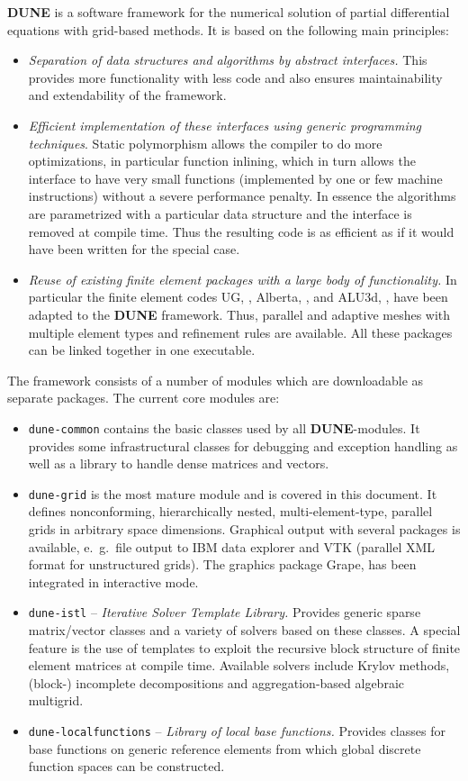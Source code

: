 \documentclass[11pt,a4paper,headinclude,footinclude,DIV16,normalheadings]{scrreprt}
\newcommand{\Dune}{{\sf\bfseries DUNE}\xspace}
\begin{document}
\Dune{} is a software framework for the numerical solution of partial
differential equations with grid-based methods. It is based on the
following main principles:
\begin{itemize}
\item \textit{Separation of data structures and
algorithms by abstract interfaces.} This provides more functionality
with less code and also ensures maintainability and
extendability of the framework.
\item \textit{Efficient implementation of these
interfaces using generic programming techniques}. Static polymorphism
allows the compiler to do more optimizations, in particular function
inlining, which in turn allows the interface to have very small
functions (implemented by one or few machine instructions) without a
severe performance penalty. In essence the algorithms are parametrized
with a particular data structure and the interface is removed at
compile time. Thus the resulting code is as efficient as if it would
have been written for the special case.
\item \textit{Reuse of existing finite element packages with a large body of
functionality.} In particular the finite element codes UG, \cite{ug},
Alberta, \cite{Alberta}, and ALU3d, \cite{ALU3d}, have been
adapted to the \Dune{} framework. Thus, parallel and adaptive meshes with
multiple element types and refinement rules are available. All these
packages can be linked together in one executable.
\end{itemize}

The framework consists of a number of modules which are downloadable
as separate packages.  The current core modules are:
\begin{itemize}
\item \texttt{dune-common} contains the basic classes used by all
  \Dune{}-modules.  It provides some infrastructural classes for
  debugging and exception handling as well as a library to handle
  dense matrices and vectors.
\item \texttt{dune-grid} is the most mature module and is covered in
  this document. It defines nonconforming, hierarchically nested,
  multi-element-type, parallel grids in arbitrary space dimensions.
  Graphical output with several packages is available, e.~g.~file
  output to IBM data explorer and VTK (parallel XML format for
  unstructured grids). The graphics package Grape, \cite{Grape} has
  been integrated in interactive mode.
\item \texttt{dune-istl} -- \textit{Iterative Solver Template
    Library.} Provides generic sparse matrix/vector classes and a
  variety of solvers based on these classes. A special feature is the
  use of templates to exploit the recursive block structure of finite
  element matrices at compile time. Available solvers include Krylov
  methods, (block-) incomplete decompositions and aggregation-based
  algebraic multigrid.
 \item \texttt{dune-localfunctions} -- \textit{Library of local base
  functions.} Provides classes for base functions on generic reference elements
  from which global discrete function spaces can be constructed.
\end{itemize}
\end{document}
